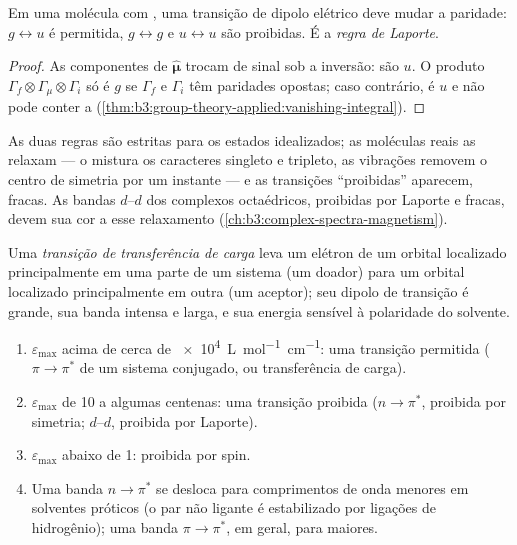 \begin{theorem}\label{thm:b3:electronic-spectroscopy:laporte}
Em uma molécula com , uma transição de dipolo elétrico deve
mudar a paridade: $g \leftrightarrow u$ é permitida, $g \leftrightarrow g$ e $u
\leftrightarrow u$ são proibidas. É a \emph{regra de Laporte}.
\end{theorem}

\begin{proof}
As componentes de $\hat{\boldsymbol\mu}$ trocam de sinal sob a inversão: são $u$.
O produto $\Gamma_f\otimes\Gamma_\mu\otimes\Gamma_i$ só é $g$ se $\Gamma_f$ e $\Gamma_i$
têm paridades opostas; caso contrário, é $u$ e não pode conter a  (\cref{thm:b3:group-theory-applied:vanishing-integral}).
\end{proof}

As duas regras são estritas para os estados idealizados; as moléculas reais as
relaxam --- o  mistura os caracteres singleto e tripleto,
as vibrações removem o centro de simetria por um instante --- e as transições
``proibidas'' aparecem, fracas. As bandas $d$--$d$ dos complexos octaédricos,
proibidas por Laporte e fracas, devem sua cor a esse relaxamento
(\cref{ch:b3:complex-spectra-magnetism}).

\begin{definition}\label{def:b3:electronic-spectroscopy:charge-transfer}
Uma \emph{transição de transferência de carga} leva um
elétron de um orbital localizado principalmente em uma parte de um sistema (um
doador) para um orbital localizado principalmente em outra (um aceptor); seu
dipolo de transição é grande, sua banda intensa e larga, e sua energia sensível
à polaridade do solvente.
\end{definition}

\begin{method}\label{met:b3:electronic-spectroscopy:assign-band}
\begin{enumerate}
  \item $\varepsilon_{\max}$ acima de cerca de \qty{e4}{L.mol^{-1}.cm^{-1}}: uma transição
        permitida ($\pi\to\pi^*$ de um sistema conjugado, ou transferência de carga).
  \item $\varepsilon_{\max}$ de 10 a algumas centenas: uma transição proibida ($n\to\pi^*$,
        proibida por simetria; $d$--$d$, proibida por Laporte).
  \item $\varepsilon_{\max}$ abaixo de 1: proibida por spin.
  \item Uma banda $n\to\pi^*$ se desloca para comprimentos de onda menores em
        solventes próticos (o par não ligante é estabilizado por ligações de
        hidrogênio); uma banda $\pi\to\pi^*$, em geral, para maiores.
\end{enumerate}
\end{method}

